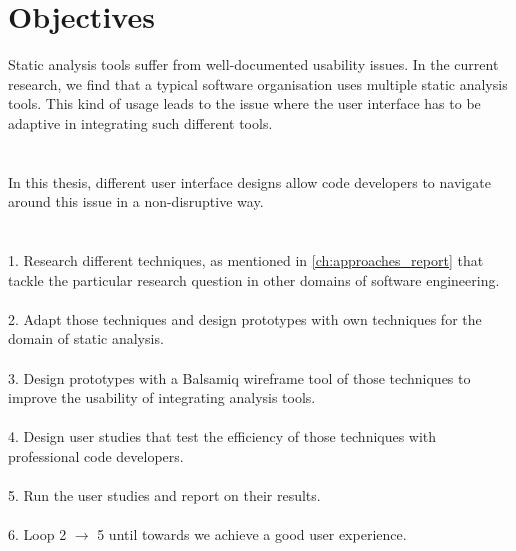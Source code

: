 \chapter{Objectives}
\label{ch:objectives_report}

Static analysis tools suffer from well-documented usability issues. \cite{CB16,JSMB13} In the current research, we find that a typical software organisation uses multiple static analysis tools. This kind of usage leads to the issue where the user interface has to be adaptive in integrating such different tools. \\ \\ \\


In this thesis, different user interface designs allow code developers to navigate around this issue in a non-disruptive way. \\ \\ \\


1. Research different techniques, as mentioned in \autoref{ch:approaches_report} that tackle the particular research question in other domains of software engineering. \\ \\

2. Adapt those techniques and design prototypes with own techniques for the domain of static analysis. \\ \\

3. Design prototypes with a Balsamiq wireframe tool \cite{B} of those techniques to improve the usability of integrating analysis tools. \\ \\

4. Design user studies that test the efficiency of those techniques with professional code developers. \\ \\

5. Run the user studies and report on their results. \\ \\

6. Loop 2 $\rightarrow$ 5 until towards we achieve a good user experience.

\let\cleardoublepage\clearpage